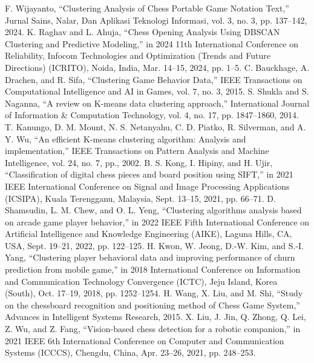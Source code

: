 \documentclass[conference]{IEEEtran}
\begin{document}
\begin{thebibliography}{00}
 F. Wijayanto, “Clustering Analysis of Chess Portable Game Notation Text,” Jurnal Sains, Nalar, Dan Aplikasi Teknologi Informasi, vol. 3, no. 3, pp. 137–142, 2024.
K. Raghav and L. Ahuja, “Chess Opening Analysis Using DBSCAN Clustering and Predictive Modeling,” in 2024 11th International Conference on Reliability, Infocom Technologies and Optimization (Trends and Future Directions) (ICRITO), Noida, India, Mar. 14–15, 2024, pp. 1–5.
 C. Bauckhage, A. Drachen, and R. Sifa, “Clustering Game Behavior Data,” IEEE Transactions on Computational Intelligence and AI in Games, vol. 7, no. 3, 2015.
 S. Shukla and S. Naganna, “A review on K-means data clustering approach,” International Journal of Information \& Computation Technology, vol. 4, no. 17, pp. 1847–1860, 2014.
 T. Kanungo, D. M. Mount, N. S. Netanyahu, C. D. Piatko, R. Silverman, and A. Y. Wu, “An efficient K-means clustering algorithm: Analysis and implementation,” IEEE Transactions on Pattern Analysis and Machine Intelligence, vol. 24, no. 7, pp., 2002.
 B. S. Kong, I. Hipiny, and H. Ujir, “Classification of digital chess pieces and board position using SIFT,” in 2021 IEEE International Conference on Signal and Image Processing Applications (ICSIPA), Kuala Terengganu, Malaysia, Sept. 13–15, 2021, pp. 66–71.
 D. Shamsudin, L. M. Chew, and O. L. Yeng, “Clustering algorithms analysis based on arcade game player behavior,” in 2022 IEEE Fifth International Conference on Artificial Intelligence and Knowledge Engineering (AIKE), Laguna Hills, CA, USA, Sept. 19–21, 2022, pp. 122–125.
 H. Kwon, W. Jeong, D.-W. Kim, and S.-I. Yang, “Clustering player behavioral data and improving performance of churn prediction from mobile game,” in 2018 International Conference on Information and Communication Technology Convergence (ICTC), Jeju Island, Korea (South), Oct. 17–19, 2018, pp. 1252–1254.
 H. Wang, X. Liu, and M. Shi, “Study on the chessboard recognition and positioning method of Chess Game System,” Advances in Intelligent Systems Research, 2015.
 X. Liu, J. Jin, Q. Zhong, Q. Lei, Z. Wu, and Z. Fang, “Vision-based chess detection for a robotic companion,” in 2021 IEEE 6th International Conference on Computer and Communication Systems (ICCCS), Chengdu, China, Apr. 23–26, 2021, pp. 248–253.
\end{thebibliography}
\end{document}
